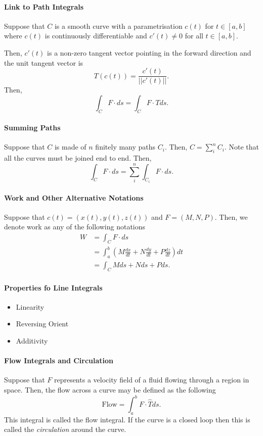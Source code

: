 \documentclass[12pt, letterpaper]{article}
\begin{document}
    \paragraph{Link to Path Integrals}
    Suppose that \(C\) is a smooth curve with a parametrisation \(c(t)\)
    for \(t\in[a, b]\) where \(c(t)\) is continuously differentiable and
    \(c'(t) \neq 0\) for all \(t\in [a, b]\).

    Then, \(c'(t)\) is a non-zero tangent vector pointing in the forward direction and the unit tangent vector is 
    \[T(c(t)) = \frac{c'(t)}{||c'(t)||}.\]
    Then,
    \[
        \int_C F\cdot ds = \int_C F \cdot T ds.
    \]
    
    \paragraph{Summing Paths}
    Suppose that \(C\) is made of \(n\) finitely many paths \(C_i\).
    Then, \(C = \sum_{i}^n C_i\).
    Note that all the curves must be joined end to end.
    Then,
    \[\int_C F \cdot ds = \sum_{i}^n \int_{C_i} F \cdot ds.\]

    \paragraph{Work and Other Alternative Notations}
    Suppose that \(c(t) = (x(t), y(t), z(t))\) and
    \(F = (M, N, P)\).
    Then, we denote work as any of the following notations
    \begin{align*}
        W
        &= \int_C F\cdot ds \\
        &= \int_a^b \left(
            M \frac{dx}{dt} + N \frac{dy}{dt} + P \frac{dz}{dt}
        \right) dt \\
        &= \int_C M ds + N ds + P ds.
    \end{align*}
    
    \paragraph{Properties fo Line Integrals}
    \begin{itemize}
        \item Linearity
        \item Reversing Orient
    \item Additivity
    \end{itemize}

    \paragraph{Flow Integrals and Circulation}
    Suppose that \(F\) represents a velocity field of a fluid flowing
    through a region in space. Then, the flow across a curve may be
    defined as the following
    \[
    \text{Flow} = \int_a^b F\cdot \hat{T}ds.
    \]
    This integral is called the flow integral. If the curve is a closed
    loop then this is called the \textit{circulation} around the curve.
\end{document}
